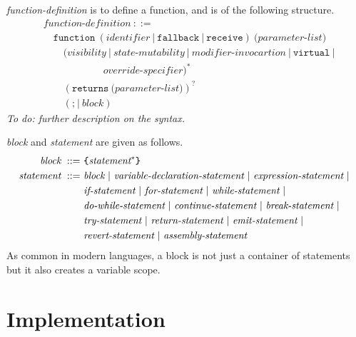 \documentclass{article}
\begin{document}
\textit{function-definition} is to define a function, and is of the following structure.
\begin{align*}
  & \textit{function-definition} ~::=~ \\
  & \quad \texttt{function}~(\textit{identifier} ~|~
  \texttt{fallback} ~|~ \texttt{receive} ) ~\texttt{(} \textit{parameter-list}\texttt{)}\\
  & \qquad (\textit{visibility} ~|~ \textit{state-mutability} ~|~ \textit{modifier-invocartion} ~|~ \texttt{virtual} ~|~ \\
  & \qquad \qquad \qquad \textit{override-specifier})^* \\
  & \qquad (\texttt{returns}~\texttt{(} \textit{parameter-list} \texttt{)})^? \\
  & \qquad (\texttt{;} ~|~ \textit{block})
\end{align*}
{\it To do: further description on the syntax.}

\textit{block} and \textit{statement} are given as follows.
\begin{align*}
\textit{block} ~::=~ & \mbox{\tt\{} \textit{statement}^* \mbox{\tt\}} \\
\textit{statement}  ~::=~ & \textit{block} ~|~
\textit{variable-declaration-statement} ~|~
\textit{expression-statement} ~|~ \\
& \textit{if-statement} ~|~
\textit{for-statement} ~|~
\textit{while-statement} ~|~ \\
& \textit{do-while-statement} ~|~
\textit{continue-statement} ~|~
\textit{break-statement} ~|~ \\
& \textit{try-statement} ~|~
\textit{return-statement} ~|~
\textit{emit-statement} ~|~\\
& \textit{revert-statement} ~|~
\textit{assembly-statement}
\end{align*}
As common in modern languages, a block is not just a container of statements but it also creates a variable scope.
\section{Implementation}
\end{document}
